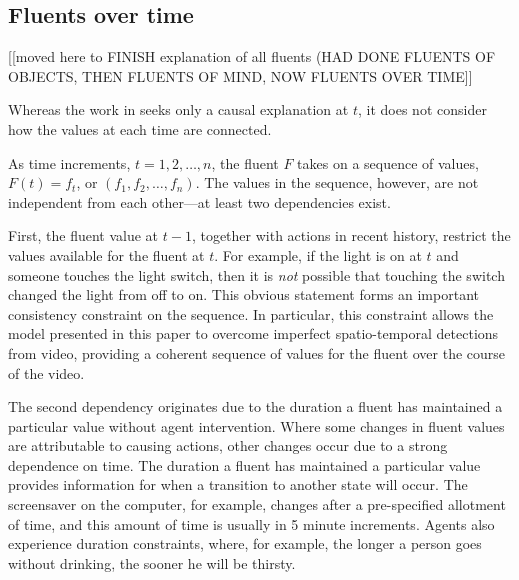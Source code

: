 \documentclass[10pt,journal,letterpaper,compsoc]{IEEEtran}
\begin{document}
\subsection{Fluents over time}


[[moved here to FINISH explanation of all fluents (HAD DONE FLUENTS OF OBJECTS, THEN FLUENTS OF MIND, NOW FLUENTS OVER TIME]]

Whereas the work in \cite{morrow2012pami} seeks only a causal explanation at $t$, it does not consider how the values at each time are connected.  

As time increments, $t = 1, 2, \ldots, n$, the fluent $F$ takes on a sequence of values, $F(t) = f_t$, or $(f_1, f_2, \ldots, f_n)$.  The values in the sequence, however, are not independent from each other---at least two dependencies exist.  

First, the fluent value at $t-1$, together with actions in recent history, restrict the values available for the fluent at $t$.  For example, if the light is on at $t$ and someone touches the light switch, then it is {\em not} possible that touching the switch changed the light from off to on.  This obvious statement forms an important consistency constraint on the sequence.  In particular, this constraint allows the model presented in this paper to overcome imperfect spatio-temporal detections from video, providing a coherent sequence of values for the fluent over the course of the video.

The second dependency originates due to the duration a fluent has maintained a particular value without agent intervention.  Where some changes in fluent values are attributable to causing actions, other changes occur due to a strong dependence on time.  The duration a fluent has maintained a particular value provides information for when a transition to another state will occur.  The screensaver on the computer, for example, changes after a pre-specified allotment of time, and this amount of time is usually in 5 minute increments.  Agents also experience duration constraints, where, for example, the longer a person goes without drinking, the sooner he will be thirsty.  

\end{document}
